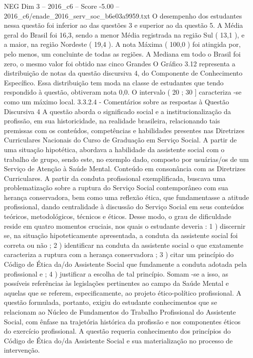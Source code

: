 \begin{textsample}{NEG Dim 3 – 2016\_c6 – Score -5.00 – 2016\_c6/enade\_2016\_serv\_soc\_b6e03a9959.txt}
O desempenho dos estudantes nessa questão foi inferior ao das questões 3 e superior ao da questão 5.
A Média geral do Brasil foi 16,3, sendo a menor Média registrada na região Sul ( 13,1 ), e a maior, na região Nordeste ( 19,4 ).
A nota Máxima ( 100,0 ) foi atingida por, pelo menos, um concluinte de todas as regiões.
A Mediana em todo o Brasil foi zero, o mesmo valor foi obtido nas cinco Grandes O Gráfico 3.12 representa a distribuição de notas da questão discursiva 4, do Componente de Conhecimento Específico.
Essa distribuição tem moda na classe de estudantes que tendo respondido à questão, obtiveram nota 0,0.
O intervalo ( 20 ; 30 ] caracteriza -se como um máximo local. 3.3.2.4 - Comentários sobre as respostas à Questão Discursiva 4 A questão aborda o significado social e a institucionalização da profissão, em sua historicidade, na realidade brasileira, relacionando tais premissas com os conteúdos, competências e habilidades presentes nas Diretrizes Curriculares Nacionais do Curso de Graduação em Serviço Social.
A partir de uma situação hipotética, abordava a habilidade da assistente social com o trabalho de grupo, sendo este, no exemplo dado, composto por usuárias/os de um Serviço de Atenção à Saúde Mental.
Conteúdo em consonância com as Diretrizes Curriculares.
A partir da conduta profissional exemplificada, buscava uma problematização sobre a ruptura do Serviço Social contemporâneo com sua herança conservadora, bem como uma reflexão ética, que fundamentasse a atitude profissional, dando centralidade à discussão do Serviço Social em seus conteúdos teóricos, metodológicos, técnicos e éticos.
Desse modo, o grau de dificuldade reside em quatro momentos cruciais, nos quais o estudante deveria : 1 ) discernir se, na situação hipoteticamente apresentada, a conduta da assistente social foi correta ou não ; 2 ) identificar na conduta da assistente social o que exatamente caracteriza a ruptura com a herança conservadora ; 3 ) citar um princípio do Código de Ética da/do Assistente Social que fundamente a conduta adotada pela profissional e ; 4 ) justificar a escolha de tal princípio.
Somam -se a isso, as possíveis referências às legislações pertinentes ao campo da Saúde Mental e aquelas que se referem, especificamente, ao projeto ético-político profissional.
A questão formulada, portanto, exigiu do estudante conhecimentos que se relacionam ao Núcleo de Fundamentos do Trabalho Profissional do Assistente Social, com ênfase na trajetória histórica da profissão e nos componentes éticos do exercício profissional.
A questão requeria conhecimento dos princípios do Código de Ética do/da Assistente Social e sua materialização no processo de intervenção.

\end{textsample}
